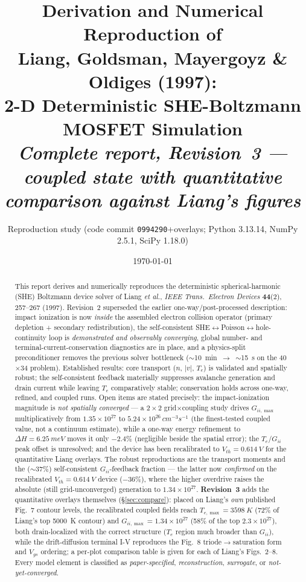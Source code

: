 \documentclass[11pt]{article}
\title{\textbf{Derivation and Numerical Reproduction of\\
Liang, Goldsman, Mayergoyz \& Oldiges (1997):\\
2-D Deterministic SHE-Boltzmann MOSFET Simulation}\\[5pt]
\large\textit{Complete report, Revision~3 --- coupled state with quantitative comparison against Liang's figures}}
\author{Reproduction study \quad\small(code commit \texttt{0994290}+overlays; Python 3.13.14, NumPy 2.5.1, SciPy 1.18.0)}
\date{\today}
\begin{document}
\maketitle

\begin{abstract}
\noindent
This report derives and numerically reproduces the deterministic spherical-harmonic (SHE)
Boltzmann device solver of Liang \emph{et al.}, \emph{IEEE Trans.\ Electron Devices}
\textbf{44}(2), 257--267 (1997). Revision~2 superseded the earlier one-way/post-processed
description: impact ionization is now \emph{inside} the assembled electron collision operator
(primary depletion + secondary redistribution), the self-consistent
SHE$\leftrightarrow$Poisson$\leftrightarrow$hole-continuity loop is \emph{demonstrated and
observably converging}, global number- and terminal-current-conservation diagnostics are in
place, and a physics-split preconditioner removes the previous solver bottleneck
($\sim$10~min~$\to$~$\sim$15~s on the 40$\times$34 problem). Established results: core
transport ($n$, $|v|$, $T_e$) is validated and spatially robust; the self-consistent feedback
materially suppresses avalanche generation and drain current while leaving $T_e$ comparatively
stable; conservation holds across one-way, refined, and coupled runs. Open items are stated
precisely: the impact-ionization magnitude is \emph{not spatially converged} --- a
$2\times2$ grid$\times$coupling study drives $G_{ii,\max}$ multiplicatively from
$1.35\times10^{27}$ to $5.24\times10^{26}\,\si{cm^{-3}s^{-1}}$ (the finest-tested coupled value,
not a continuum estimate), while a one-way energy refinement to $\Delta H=\SI{6.25}{meV}$ moves it
only $-2.4\%$ (negligible beside the spatial error); the $T_e$/$G_{ii}$ peak offset is unresolved;
and the device has been recalibrated to $V_{th}=\SI{0.614}{V}$ for the quantitative Liang overlays.
The robust reproductions are the transport moments and the ($\sim$37\%) self-consistent
$G_{ii}$-feedback fraction --- the latter now \emph{confirmed} on the recalibrated
$V_{th}=\SI{0.614}{V}$ device ($-36\%$), where the higher overdrive raises the absolute
(still grid-unconverged) generation to $1.34\times10^{27}$.
\textbf{Revision~3} adds the quantitative overlays themselves (\S\ref{sec:compare}): placed on
Liang's \emph{own} published Fig.~7 contour levels, the recalibrated coupled fields reach
$T_{e,\max}=\SI{3598}{K}$ (72\% of Liang's top \SI{5000}{K} contour) and
$G_{ii,\max}=1.34\times10^{27}$ (58\% of the top $2.3\times10^{27}$), both drain-localized with the
correct structure ($T_e$ region much broader than $G_{ii}$), while the drift-diffusion terminal I-V
reproduces the Fig.~8 triode$\to$saturation form and $V_{gs}$ ordering; a per-plot comparison table
is given for each of Liang's Figs.~2--8.
Every model element is classified as \emph{paper-specified},
\emph{reconstruction}, \emph{surrogate}, or \emph{not-yet-converged}.
\end{abstract}
\end{document}
